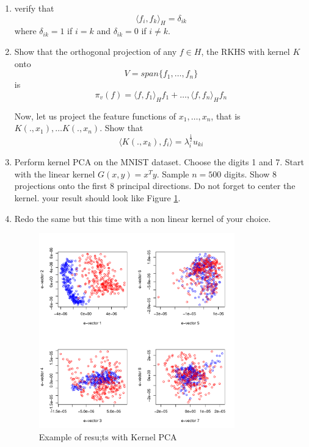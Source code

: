 \documentclass{article}[12pt]
\begin{document}
\begin{enumerate}
\item verify that 
\begin{equation}
\langle f_i,f_k \rangle_H=\delta_{ik}
\end{equation}
where $\delta_{ik}=1$ if $i=k$ and $\delta_{ik}=0$ if $i \not = k$. 
\item Show that the orthogonal projection of any $f \in H$, the RKHS with kernel $K$ onto 
\begin{equation}
V=span\{f_1,\ldots,f_n\}
\end{equation} is 
\begin{equation}
\pi_v(f)=\langle f,f_1\rangle_H f_1+\ldots,\langle f,f_n\rangle_H f_n
\end{equation}

Now, let us project the feature functions of $x_1,\ldots,x_n$, that is $K(.,x_1), \ldots K(.,x_n)$. Show that 
 \begin{equation}
\langle K(.,x_k),f_i \rangle = \lambda_i^\frac{1}{2} u_{ki}
\end{equation}
\item Perform kernel PCA on the MNIST dataset. Choose the digits 1 and 7. Start with the linear kernel $G(x,y)=x^Ty$. Sample $n=500$ digits. Show 8 projections onto the first 8 principal directions. Do not forget to center the kernel. your result should look like Figure \ref{fig:kpca}. 
\item Redo the same but this time with a non linear kernel of your choice. 
\begin{figure}
\includegraphics[width=0.8\textwidth]{kpca-mnist-linear}
\caption{\label{fig:kpca}Example of resu;ts with Kernel PCA}
\end{figure}
 
\end{enumerate}
\end{document}

